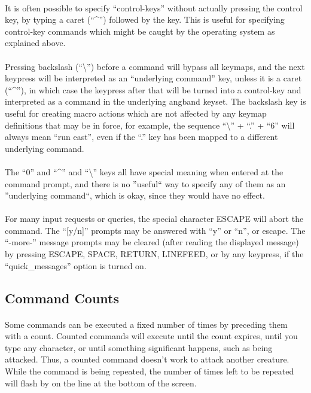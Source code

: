 \paragraph{}It is often possible to specify ``control-keys'' without actually
pressing the control key, by typing a caret (``\^{}'') followed by the key.
This is useful for specifying control-key commands which might be caught
by the operating system as explained above.

\paragraph{}Pressing backslash (``\textbackslash '') before a command will bypass all keymaps,
and the next keypress will be interpreted as an ``underlying command'' key,
unless it is a caret (``\^{}''), in which case the keypress after that will be
turned into a control-key and interpreted as a command in the underlying
angband keyset. The backslash key is useful for creating macro actions
which are not affected by any keymap definitions that may be in force, for
example, the sequence ``\textbackslash '' + ``.'' + ``6'' will always mean ``run east'', even if
the ``.'' key has been mapped to a different underlying command.

\paragraph{}The ``0'' and ``\^{}'' and ``\textbackslash '' keys all have special meaning when entered
at the command prompt, and there is no ''useful`` way to specify any of them
as an ''underlying command``, which is okay, since they would have no effect.

\paragraph{}For many input requests or queries, the special character ESCAPE
will abort the command. The ``[y/n]'' prompts may be answered with ``y'' or
``n'', or escape. The ``-more-'' message prompts may be cleared (after reading
the displayed message) by pressing ESCAPE, SPACE, RETURN, LINEFEED, or by
any keypress, if the ``quick\_messages'' option is turned on.
 

\subsection{Command Counts}
 
\paragraph{}Some commands can be executed a fixed number of times by preceding
them with a count. Counted commands will execute until the count expires,
until you type any character, or until something significant happens, such
as being attacked. Thus, a counted command doesn't work to attack another
creature. While the command is being repeated, the number of times left
to be repeated will flash by on the line at the bottom of the screen.

